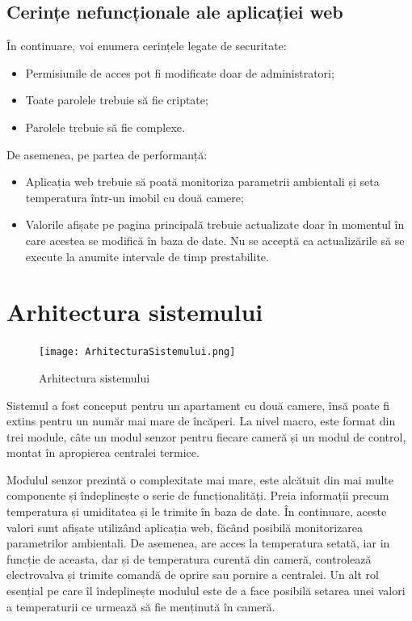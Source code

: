 \subsection{Cerințe nefuncționale ale aplicației web}

	În continuare, voi enumera cerințele legate de securitate:
	\begin{itemize}
		\setlength{\itemindent}{2em}
		\itemsep0em
		\item Permisiunile de acces pot fi modificate doar de administratori;
		\item Toate parolele trebuie să fie criptate;
		\item Parolele trebuie să fie complexe. 
	\end{itemize} 

\vspace{1em}

	De asemenea, pe partea de performanță:
	\begin{itemize}
		\setlength{\itemindent}{2em}
		\itemsep0em
		\item Aplicația web trebuie să poată monitoriza parametrii ambientali și seta temperatura într-un imobil cu două camere;
		\item Valorile afișate pe pagina principală trebuie actualizate doar în momentul în care acestea se modifică în baza de date. Nu se acceptă ca actualizările să se execute la anumite intervale de timp prestabilite. 
	\end{itemize} 
 

\section{Arhitectura sistemului}

\begin{figure}[H]
   	\centering
    	\texttt{[image: ArhitecturaSistemului.png]}
	\caption{Arhitectura sistemului}
\end{figure}

	Sistemul a fost conceput pentru un apartament cu două camere, însă poate fi extins pentru un număr mai mare de încăperi. La nivel macro, este format din trei module, câte un modul senzor pentru fiecare cameră și un modul de control, montat în apropierea centralei termice.

	Modulul senzor prezintă o complexitate mai mare, este alcătuit din mai multe componente și îndeplinește o serie de funcționalități. Preia informații precum temperatura și umiditatea și le trimite în baza de date. În continuare, aceste valori sunt afișate utilizând aplicația web, făcând posibilă monitorizarea parametrilor ambientali. De asemenea, are acces la temperatura setată, iar in funcție de aceasta, dar și de temperatura curentă din cameră, controlează electrovalva și trimite comandă de oprire sau pornire a centralei. Un alt rol esențial pe care îl îndeplinește modulul este de a face posibilă setarea unei valori a temperaturii ce urmează să fie menținută în cameră.

